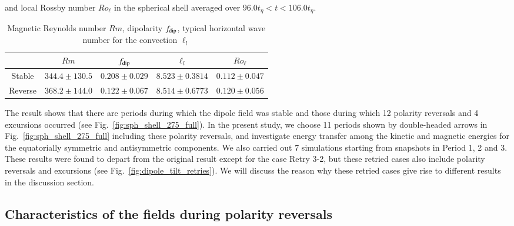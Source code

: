 \begin{table}[t]
\caption{Magnetic Reynolds number $Rm$, dipolarity $f_{\rm dip}$, 
typical horizontal wave number for the convection $\ell_{l}$ }
and local Rossby number $Ro_{\ell}$ in the spherical shell averaged over $96.0 t_{\eta} < t < 106.0 t_{\eta}$.
\label{table:average_dipolarity}
\begin{tabular}{ccccc}
 & $Rm$ & $f_{\rm dip}$ & 
  ${\ell}_{l}$ & $Ro_{\ell}$ \\ \hline
\mbox{Stable} & $344.4 \pm 130.5 $ &
                $0.208 \pm 0.029$ &
                $8.523 \pm 0.3814$ & 
                $0.112 \pm 0.047$ \\
\mbox{Reverse} & $368.2 \pm 144.0 $ &
                 $0.122 \pm 0.067$ &
                 $8.514 \pm 0.6773$ & 
                 $0.120 \pm 0.056$\\ \hline
\end{tabular}
\end{table}
%

The result shows that there are periods during which the dipole field was stable and those during which 12 polarity reversals and 4 excursions occurred (see Fig.~\ref{fig:sph_shell_275_full}).
In the present study, we choose 11 %
periods shown by double-headed arrows in Fig.~\ref{fig:sph_shell_275_full} including these polarity reversals, and investigate energy transfer among the kinetic and magnetic energies for the equatorially symmetric and antisymmetric components. 
We also carried out 7 simulations starting from snapshots in Period 1, 2 and 3. 
These results were found to depart from the original result except for the case Retry 3-2, but these retried cases also include polarity reversals and excursions (see Fig.~\ref{fig:dipole_tilt_retries}). 
We will discuss the reason why these retried cases give rise to different results in the discussion section.

\subsection{Characteristics of the fields during polarity reversals}

